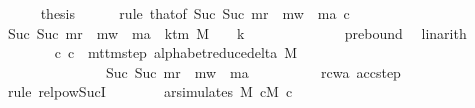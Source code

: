 \begin{isabellebody}
\ \ \ \ \isamarkupfalse%
\ thesis\isanewline
\ \ \ \ \isamarkupfalse%
\ {\isacharparenleft}{\kern0pt}rule\ that{\isacharbrackleft}{\kern0pt}of\ {\isachardoublequoteopen}Suc\ {\isacharparenleft}{\kern0pt}Suc\ m{\isacharunderscore}{\kern0pt}r\ {\isacharplus}{\kern0pt}\ m{\isacharunderscore}{\kern0pt}w\ {\isacharplus}{\kern0pt}\ m{\isacharunderscore}{\kern0pt}a{\isacharparenright}{\kern0pt}{\isachardoublequoteclose}\ c{\isacharprime}{\kern0pt}{\isacharprime}{\kern0pt}{\isacharbrackright}{\kern0pt}{\isacharparenright}{\kern0pt}\isanewline
\ \ \ \ \ \ \isamarkupfalse%
\ {\isachardoublequoteopen}Suc\ {\isacharparenleft}{\kern0pt}Suc\ m{\isacharunderscore}{\kern0pt}r\ {\isacharplus}{\kern0pt}\ m{\isacharunderscore}{\kern0pt}w\ {\isacharplus}{\kern0pt}\ m{\isacharunderscore}{\kern0pt}a{\isacharparenright}{\kern0pt}\ {\isasymle}\ k{\isacharunderscore}{\kern0pt}tm\ M\ {\isacharasterisk}{\kern0pt}\ {\isacharparenleft}{\kern0pt}{}\ {\isacharasterisk}{\kern0pt}\ {\isacharquery}{\kern0pt}k\ {\isacharplus}{\kern0pt}\ {}{\isacharparenright}{\kern0pt}\ {\isacharplus}{\kern0pt}\ {}{\isachardoublequoteclose}\isanewline
\ \ \ \ \ \ \ \ \isamarkupfalse%
\ pre{\isacharunderscore}{\kern0pt}bound\ \isamarkupfalse%
\ linarith\isanewline
\ \ \ \ \ \ \isamarkupfalse%
\ {\isachardoublequoteopen}{\isacharparenleft}{\kern0pt}c{\isacharprime}{\kern0pt}{\isacharcomma}{\kern0pt}\ c{\isacharprime}{\kern0pt}{\isacharprime}{\kern0pt}{\isacharparenright}{\kern0pt}\ {\isasymin}\ {\isacharparenleft}{\kern0pt}mttm{\isacharunderscore}{\kern0pt}step\ {\isacharparenleft}{\kern0pt}alphabet{\isacharunderscore}{\kern0pt}reduce{\isacharunderscore}{\kern0pt}delta\ M{\isacharparenright}{\kern0pt}{\isacharparenright}{\kern0pt}\isanewline
\ \ \ \ \ \ \ \ \ \ \ \ \ \ {\isacharcircum}{\kern0pt}{\isacharcircum}{\kern0pt}\ Suc\ {\isacharparenleft}{\kern0pt}Suc\ m{\isacharunderscore}{\kern0pt}r\ {\isacharplus}{\kern0pt}\ m{\isacharunderscore}{\kern0pt}w\ {\isacharplus}{\kern0pt}\ m{\isacharunderscore}{\kern0pt}a{\isacharparenright}{\kern0pt}{\isachardoublequoteclose}\isanewline
\ \ \ \ \ \ \ \ \isamarkupfalse%
\ rcwa\ acc{\isacharunderscore}{\kern0pt}step\ \isamarkupfalse%
\ {\isacharparenleft}{\kern0pt}rule\ relpow{\isacharunderscore}{\kern0pt}Suc{\isacharunderscore}{\kern0pt}I{\isacharparenright}{\kern0pt}\isanewline
\ \ \ \ \ \ \isamarkupfalse%
\ {\isachardoublequoteopen}ar{\isacharunderscore}{\kern0pt}simulates\ M\ cM{\isacharunderscore}{\kern0pt}{}\ c{\isacharprime}{\kern0pt}{\isacharprime}{\kern0pt}{\isachardoublequoteclose}\isanewline

\end{isabellebody}
